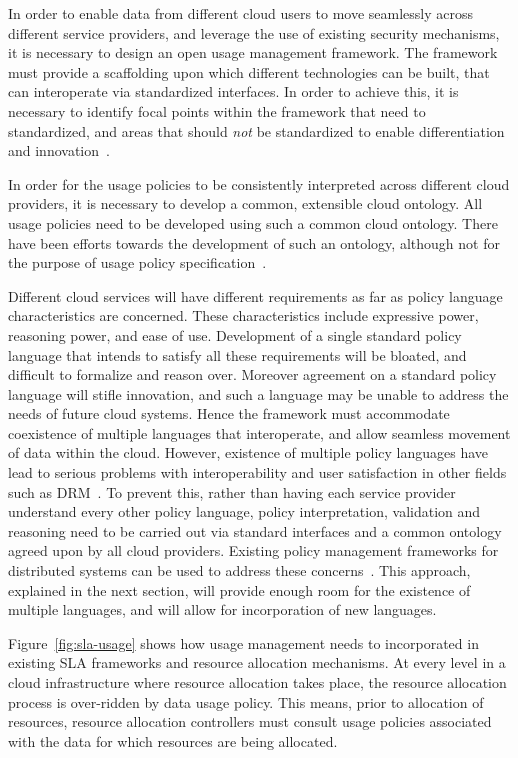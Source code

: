 \documentclass[10pt, conference, compsocconf]{IEEEtran}
\begin{document}
In order to enable data from different cloud users to move seamlessly across different service providers, and leverage the use of existing security mechanisms, it is necessary to design an open usage management framework. The framework must provide a scaffolding upon which different technologies can be built, that can interoperate via standardized interfaces. In order to achieve this, it is necessary to identify focal points within the framework that need to standardized, and areas that should {\em not} be standardized to enable differentiation and innovation~\cite{BlCl:01}. 

In order for the usage policies to be consistently interpreted across different cloud providers, it is necessary to develop a common, extensible cloud ontology. All usage policies need to be developed using such a common cloud ontology.  There have been efforts towards the development of such an ontology, although not for the purpose of usage policy specification~\cite{YuBuDa:08}. 

Different cloud services will have different requirements as far as policy language characteristics are concerned. These characteristics  include expressive power, reasoning power, and ease of use. Development of  a single standard policy language that intends to satisfy all these requirements will be bloated, and difficult to formalize and reason over. Moreover agreement on a standard policy language will stifle innovation, and such a  language may be unable to address the needs of  future cloud systems. Hence the framework must accommodate coexistence of multiple languages that interoperate, and allow seamless movement of data within the cloud. However, existence of multiple policy languages have lead to serious problems with interoperability and user satisfaction in other fields such as DRM~\cite{JaHeMa:06}. To prevent this, rather than having each service provider understand every other policy language, policy interpretation, validation and reasoning need to be carried out via standard interfaces and a common ontology agreed upon by all cloud providers. Existing policy management frameworks for distributed systems can be used to address these concerns~\cite{JaHeLa:10,DaDuLuSl:01}. This approach, explained in the next section, will provide enough room for the existence of multiple languages, and will allow for incorporation of new languages. 

Figure~\ref{fig:sla-usage} shows how usage management needs to incorporated in existing SLA frameworks and resource allocation mechanisms. At every level in a cloud infrastructure where resource allocation takes place, the resource allocation process is over-ridden by data usage policy. This means, prior to allocation of resources,  resource allocation controllers must consult usage policies associated with the data for which resources are being allocated. 
\end{document}
